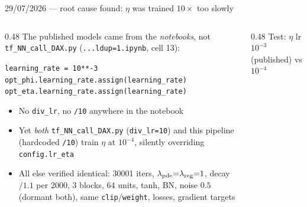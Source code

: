 \documentclass[aspectratio=169,11pt]{beamer}
\newcommand{\gold}[1]{{\color{ntugold}#1}}
\newcommand{\red}[1]{{\color{ntured}#1}}
\begin{document}

\begin{frame}{29/07/2026 --- root cause found: $\eta$ was trained $10\times$ too slowly}
  \begin{columns}[T]
    \begin{column}{0.48\linewidth}
      \gold{The published models came from the \emph{notebooks}}, not \texttt{tf\_NN\_call\_DAX.py}
      (\texttt{...ldup=1.ipynb}, cell 13):
      \begin{center}\tiny
      \begin{minipage}{0.97\linewidth}
      \texttt{learning\_rate = 10**-3}\\
      \texttt{opt\_phi.learning\_rate.assign(learning\_rate)}\\
      \texttt{opt\_eta.learning\_rate.assign(learning\_rate)}\;\red{$\leftarrow$ SAME}
      \end{minipage}
      \end{center}
      \begin{itemize}\scriptsize
        \item No \texttt{div\_lr}, no \texttt{/10} anywhere in the notebook
        \item Yet \emph{both} \texttt{tf\_NN\_call\_DAX.py} (\texttt{div\_lr=10}) and this pipeline
              (hardcoded \texttt{/10}) train $\eta$ at \red{$10^{-4}$}, silently overriding
              \texttt{config.lr\_eta}
        \item All else verified identical: 30001 iters, $\lambda_{\rm pde}{=}\lambda_{\rm reg}{=}1$,
              decay $/1.1$ per 2000, 3 blocks, 64 units, tanh, BN, noise $0.5$ (dormant both),
              same \texttt{clip}/\texttt{weight}, losses, gradient targets
      \end{itemize}
    \end{column}
    \begin{column}{0.48\linewidth}
      \gold{Test: $\eta$ lr $10^{-3}$ (published) vs $10^{-4}$}


\end{column}
\end{columns}
\end{frame}
\end{document}
